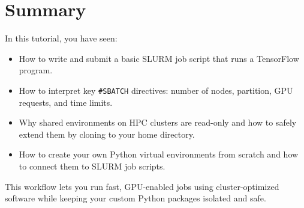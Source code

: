 \documentclass[11pt]{article}
\begin{document}
\section{Summary}
\label{sec:summary}

In this tutorial, you have seen:

\begin{itemize}
  \item How to write and submit a basic SLURM job script that runs a TensorFlow program.
  \item How to interpret key \texttt{\#SBATCH} directives: number of nodes, partition, GPU requests, and time limits.
  \item Why shared environments on HPC clusters are read-only and how to safely extend them by cloning to your home directory.
  \item How to create your own Python virtual environments from scratch and how to connect them to SLURM job scripts.
\end{itemize}

This workflow lets you run fast, GPU-enabled jobs using cluster-optimized software while keeping your custom Python packages isolated and safe.

\printindex
\end{document}
